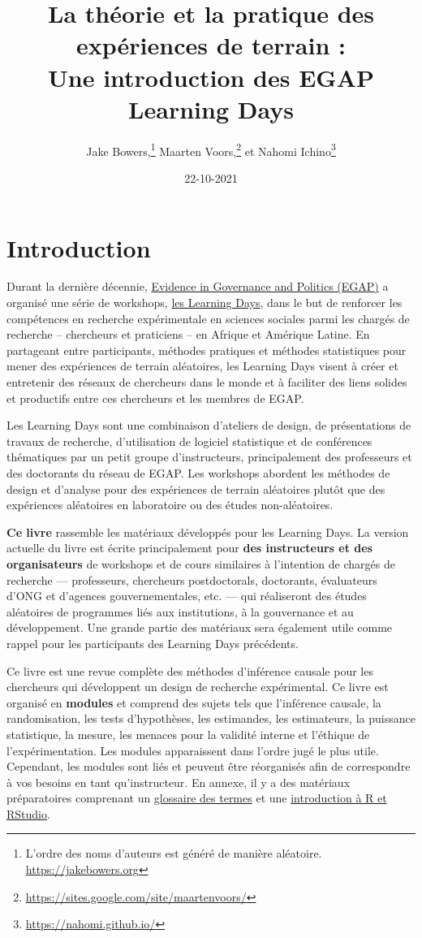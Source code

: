 \documentclass[
  12pt,
]{book}
\title{La théorie et la pratique des expériences de terrain :\\
Une introduction des EGAP Learning Days}
\author{Jake Bowers,\footnote{L'ordre des noms d'auteurs est généré de manière aléatoire. \url{https://jakebowers.org}} Maarten Voors,\footnote{\url{https://sites.google.com/site/maartenvoors/}} et Nahomi Ichino\footnote{\url{https://nahomi.github.io/}}}
\date{22-10-2021}
\begin{document}
\maketitle

\captionsetup[table]{list=no}
\captionsetup[figure]{list=no}

{
\hypersetup{linkcolor=}
\setcounter{tocdepth}{1}
\tableofcontents
}
\hypertarget{introduction}{%
\chapter{Introduction}\label{introduction}}

Durant la dernière décennie, \href{https://egap.org/}{Evidence in Governance and Politics (EGAP)} a organisé une série de workshops, \href{https://egap.org/learning-days/}{les Learning Days}, dans le but de renforcer les compétences en recherche expérimentale en sciences sociales parmi les chargés de recherche -- chercheurs et praticiens -- en Afrique et Amérique Latine. En partageant entre participants, méthodes pratiques et méthodes statistiques pour mener des expériences de terrain aléatoires, les Learning Days visent à créer et entretenir des réseaux de chercheurs dans le monde et à faciliter des liens solides et productifs entre ces chercheurs et les membres de EGAP.

Les Learning Days sont une combinaison d'ateliers de design, de présentations de travaux de recherche, d'utilisation de logiciel statistique et de conférences thématiques par un petit groupe d'instructeurs, principalement des professeurs et des doctorants du réseau de EGAP. Les workshops abordent les méthodes de design et d'analyse pour des expériences de terrain aléatoires plutôt que des expériences aléatoires en laboratoire ou des études non-aléatoires.

\textbf{Ce livre} rassemble les matériaux développés pour les Learning Days. La version actuelle du livre est écrite principalement pour \textbf{des instructeurs et des organisateurs} de workshops et de cours similaires à l'intention de chargés de recherche --- professeurs, chercheurs postdoctorals, doctorants, évaluateurs d'ONG et d'agences gouvernementales, etc. --- qui réaliseront des études aléatoires de programmes liés aux institutions, à la gouvernance et au développement. Une grande partie des matériaux sera également utile comme rappel pour les participants des Learning Days précédents.

Ce livre est une revue complète des méthodes d'inférence causale pour les chercheurs qui développent un design de recherche expérimental. Ce livre est organisé en \textbf{modules} et comprend des sujets tels que l'inférence causale, la randomisation, les tests d'hypothèses, les estimandes, les estimateurs, la puissance statistique, la mesure, les menaces pour la validité interne et l'éthique de l'expérimentation. Les modules apparaissent dans l'ordre jugé le plus utile. Cependant, les modules sont liés et peuvent être réorganisés afin de correspondre à vos besoins en tant qu'instructeur. En annexe, il y a des matériaux préparatoires comprenant un \href{glossary-of-terms.html}{glossaire des termes} et une \href{introduction-to-r-and-rstudio.html}{introduction à R et RStudio}.
\end{document}
